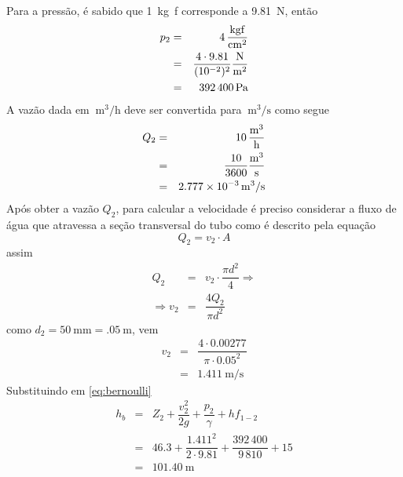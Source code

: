 \documentclass[a4paper, 12pt, brazilian]{article}
\begin{document}
	Para a pressão, é sabido que \SI{1}{\kilogram f} corresponde a \SI{9.81}{\newton}, então
	\begin{eqnarray}
		p_{2}&=&\SI{4}{\dfrac{\kilogram f}{\centi\meter^{2}}}\\
			 &=&\dfrac{4\cdot 9.81}{(10^{-2})^{2}}\SI{}{\dfrac{\newton}{\meter^{2}}}\\
			 &=&\SI{392400}{\pascal}
	\end{eqnarray}
	A vazão dada em $\SI{}{\meter^{3}/\hour}$ deve ser convertida para $\SI{}{\meter^{3}/\second}$ como segue
	\begin{eqnarray}
		Q_{2}&=&\SI{10}{\dfrac{\meter^{3}}{\hour}}\\
			 &=&\dfrac{10}{3600}\SI{}{\dfrac{\meter^{3}}{\second}}\\
			 &=&\SI{2.777e-3}{\meter^{3}/\second}
	\end{eqnarray}
	Após obter a vazão $Q_{2}$, para calcular a velocidade é preciso considerar a fluxo de água que atravessa a seção transversal do tubo como é descrito pela equação
	\begin{equation}
		Q_{2}=v_{2}\cdot A
	\end{equation}
	assim
	\begin{eqnarray}
		Q_{2}&=&v_{2}\cdot\dfrac{\pi d^{2}}{4}\Rightarrow\\
		\Rightarrow	v_{2}&=&\dfrac{4Q_{2}}{\pi d^{2}}
	\end{eqnarray}
	como $d_{2}=\SI{50}{\milli\meter}=\SI{.05}{\meter}$, vem
	\begin{eqnarray}
		v_{2}&=&\dfrac{4\cdot 0.00277}{\pi\cdot 0.05^{2}}\\
			 &=&\SI{1.411}{\meter/\second}
	\end{eqnarray}
	Substituindo em \eqref{eq:bernoulli}
	\begin{eqnarray}
		h_{b}&=&Z_{2}+\dfrac{v_{2}^{2}}{2g}+\dfrac{p_{2}}{\gamma}+hf_{1-2}\\
			 &=&46.3+\dfrac{1.411^{2}}{2\cdot 9.81}+\dfrac{392\,400}{9\,810}+15\\
			 &=&\SI{101.40}{\meter}
	\end{eqnarray}
\end{document}
